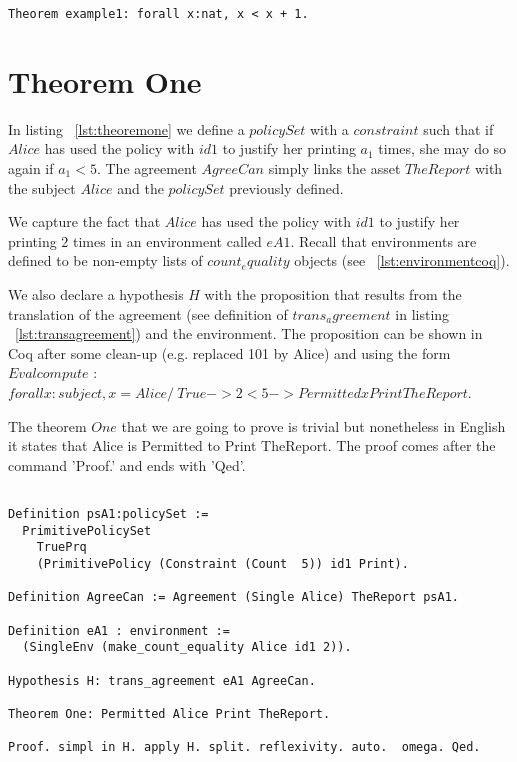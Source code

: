 \lstset{language=Coq}
\begin{lstlisting}[frame=single, caption={Proof Example},label={lst:proofexample}]
Theorem example1: forall x:nat, x < x + 1.
\end{lstlisting}

\section{Theorem One}

In listing ~\ref{lst:theoremone} we define a $policySet$ with a $constraint$ such that if $Alice$ has used the policy with $id1$ to justify her printing $a_{1}$ times, she may do so again if $a_{1} < 5$. The agreement $AgreeCan$ simply links the asset $TheReport$ with the subject $Alice$ and the $policySet$ previously defined. 

We capture the fact that $Alice$ has used the policy with $id1$ to justify her printing $2$ times in an environment called $eA1$. Recall that environments are defined to be non-empty lists of $count_equality$ objects (see ~\ref{lst:environmentcoq}). 

We also declare a hypothesis $H$ with the proposition that results from the translation of the agreement (see definition of $trans_agreement$ in listing ~\ref{lst:transagreement}) and the environment. The proposition can be shown in Coq after some clean-up (e.g. replaced 101 by Alice) and using the form $Eval compute$ : $forall x : subject, x = Alice /\ True -> 2 < 5 -> Permitted x Print TheReport$. 

The theorem $One$ that we are going to prove is trivial but nonetheless in English it states that Alice is Permitted to Print TheReport. The proof comes after the command 'Proof.' and ends with 'Qed'. 

\lstset{language=Coq}
\begin{lstlisting}[frame=single, caption={Theorem One},label={lst:theoremone}]

Definition psA1:policySet :=
  PrimitivePolicySet
    TruePrq
    (PrimitivePolicy (Constraint (Count  5)) id1 Print).

Definition AgreeCan := Agreement (Single Alice) TheReport psA1.

Definition eA1 : environment := 
  (SingleEnv (make_count_equality Alice id1 2)).

Hypothesis H: trans_agreement eA1 AgreeCan.

Theorem One: Permitted Alice Print TheReport.

Proof. simpl in H. apply H. split. reflexivity. auto.  omega. Qed.


\end{lstlisting}






